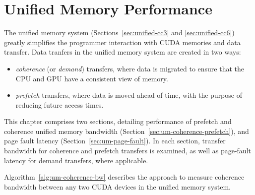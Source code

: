 \chapter{Unified Memory Performance}
\label{ch:unified}

The unified memory system (Sections~\ref{sec:unified-cc3} and \ref{sec:unified-cc6}) greatly simplifies the programmer interaction with CUDA memories and data transfer.
Data tranfers in the unified memory system are created in two ways:
\begin{itemize}
	\item \textit{coherence} (or \textit{demand}) transfers, where data is migrated to ensure that the CPU and GPU have a consistent view of memory.
	\item \textit{prefetch} transfers, where data is moved ahead of time, with the purpose of reducing future access times. 
\end{itemize}
This chapter comprises two sections, detailing performance of prefetch and coherence unified memory bandwidth (Section~\ref{sec:um-coherence-prefetch}), and page fault latency (Section~\ref{sec:um-page-fault}).
In each section, transfer bandwidth for coherence and prefetch transfers is examined, as well as page-fault latency for demand transfers, where applicable.

Algorithm~\ref{alg:um-coherence-bw} describes the approach to measure coherence bandwidth between any two CUDA devices in the unified memory system.

